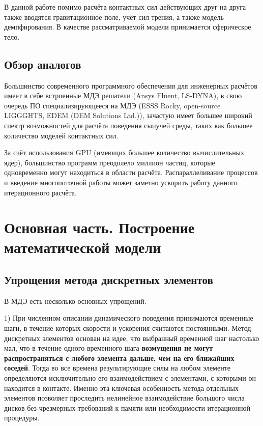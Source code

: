 \documentclass[a4paper]{article}
\begin{document}
В данной работе помимо расчёта контактных сил действующих друг на друга также вводятся гравитационное поле, учёт сил трения, а также модель демпфирования. 
В качестве рассматриваемой модели принимается сферическое тело.

\subsection{Обзор аналогов}

Большинство современного программного обеспечения для инженерных расчётов имеет в себе встроенные МДЭ решатели (Ansys Fluent, LS-DYNA), в свою очередь ПО специализирующееся на МДЭ (ESSS Rocky, open-source LIGGGHTS, EDEM (DEM Solutions Ltd.)), зачастую имеет большее широкий спектр возможностей для расчёта поведения сыпучей среды, таких как большее количество моделей контактных сил.

За счёт использования GPU (имеющих большее количество вычислительных ядер), большинство программ преодолело миллион частиц, которые одновременно могут находиться в области расчёта. 
Распараллеливание процессов и введение многопоточной работы может заметно ускорить работу данного итерационного расчёта.

\newpage

\section{Основная часть. Построение математической модели}

\subsection{Упрощения метода дискретных элементов}
В МДЭ есть несколько основных упрощений. 

1) При численном описании динамического поведения принимаются временные шаги, в течение которых скорости и ускорения считаются постоянными.
Метод дискретных элементов основан на идее, что выбранный временной шаг настолько мал, что в течение одного временного шага \textbf{возмущения не могут распространяться с любого элемента дальше, чем на его ближайших соседей}. 
Тогда во все времена результирующие силы на любом элементе определяются исключительно его взаимодействием с элементами, с которыми он находится в контакте.
Именно эта ключевая особенность метода отдельных элементов позволяет проследить нелинейное взаимодействие большого числа дисков без чрезмерных требований к памяти или необходимости итерационной процедуры.
\end{document}
